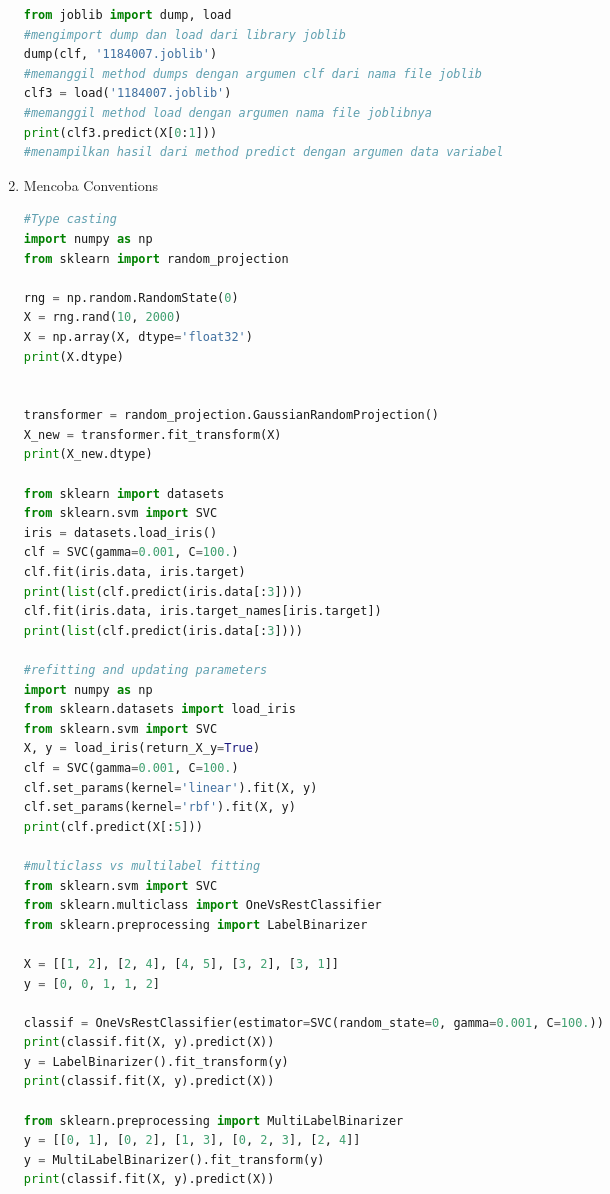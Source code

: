 \begin{enumerate}
\begin{lstlisting}[language=Python]
from joblib import dump, load 
#mengimport dump dan load dari library joblib
dump(clf, '1184007.joblib') 
#memanggil method dumps dengan argumen clf dari nama file joblib
clf3 = load('1184007.joblib') 
#memanggil method load dengan argumen nama file joblibnya
print(clf3.predict(X[0:1])) 
#menampilkan hasil dari method predict dengan argumen data variabel
\end{lstlisting}
\item Mencoba Conventions
\begin{lstlisting}[language=Python]
#Type casting
import numpy as np
from sklearn import random_projection

rng = np.random.RandomState(0)
X = rng.rand(10, 2000)
X = np.array(X, dtype='float32')
print(X.dtype)


transformer = random_projection.GaussianRandomProjection()
X_new = transformer.fit_transform(X)
print(X_new.dtype)

from sklearn import datasets
from sklearn.svm import SVC
iris = datasets.load_iris()
clf = SVC(gamma=0.001, C=100.)
clf.fit(iris.data, iris.target)
print(list(clf.predict(iris.data[:3])))
clf.fit(iris.data, iris.target_names[iris.target])
print(list(clf.predict(iris.data[:3])))

#refitting and updating parameters
import numpy as np
from sklearn.datasets import load_iris
from sklearn.svm import SVC
X, y = load_iris(return_X_y=True)
clf = SVC(gamma=0.001, C=100.)
clf.set_params(kernel='linear').fit(X, y)
clf.set_params(kernel='rbf').fit(X, y)
print(clf.predict(X[:5]))

#multiclass vs multilabel fitting
from sklearn.svm import SVC
from sklearn.multiclass import OneVsRestClassifier
from sklearn.preprocessing import LabelBinarizer

X = [[1, 2], [2, 4], [4, 5], [3, 2], [3, 1]]
y = [0, 0, 1, 1, 2]

classif = OneVsRestClassifier(estimator=SVC(random_state=0, gamma=0.001, C=100.))
print(classif.fit(X, y).predict(X))
y = LabelBinarizer().fit_transform(y)
print(classif.fit(X, y).predict(X))

from sklearn.preprocessing import MultiLabelBinarizer
y = [[0, 1], [0, 2], [1, 3], [0, 2, 3], [2, 4]]
y = MultiLabelBinarizer().fit_transform(y)
print(classif.fit(X, y).predict(X))

\end{lstlisting}
\end{enumerate}


